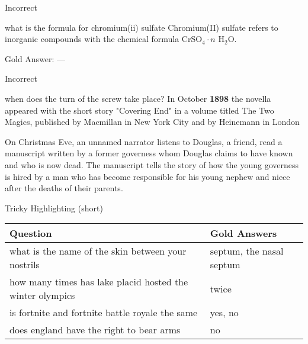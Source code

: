 \documentclass[xcolor=table]{beamer}
\begin{document}
\begin{frame}{Incorrect}

  \begin{block}{what is the formula for chromium(ii) sulfate}
    Chromium(II) sulfate refers to inorganic compounds with the chemical formula CrSO$_4 \cdot n$ H$_2$O.
  \end{block}

  Gold Answer: ---

\end{frame}

\begin{frame}{Incorrect}

  \begin{block}{when does the turn of the screw take place?}
    In October {\bf 1898} the novella appeared with the short story
    "Covering End" in a volume titled The Two Magics, published by
    Macmillan in New York City and by Heinemann in London
  \end{block}

  \pause On \alert<2>{Christmas Eve}, an unnamed narrator listens to
  Douglas, a friend, read a manuscript written by a former
  \alert<3>{governess whom Douglas claims to have known and who is now
    dead}. The manuscript tells the story of how the young governess
  is hired by a man who has become responsible for his young nephew
  and niece after the deaths of their parents.

\end{frame}

\begin{frame}{Tricky Highlighting (short)}
 
  \begin{tabular}{p{7cm}p{3cm}}
    \toprule
    Question & Gold Answers \\
    \hline
    what is the name of the skin between your nostrils & septum, 
    the nasal septum \\
    how many times has lake placid hosted the winter olympics & twice \\
    is fortnite and fortnite battle royale the same & yes, no \\
    does england have the right to bear arms & no \\
    \bottomrule
  \end{tabular}

\end{frame}
\end{document}
